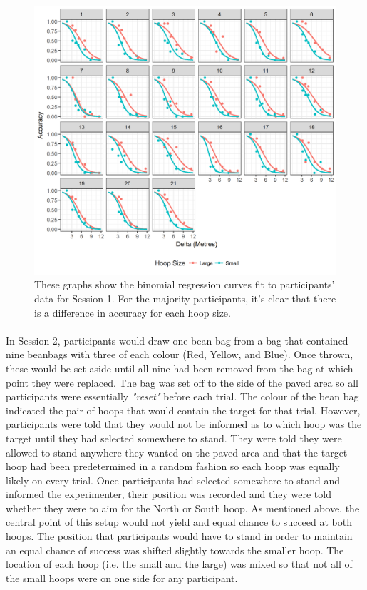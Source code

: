 \documentclass[12pt]{article}
\begin{document}
\begin{figure}[ht!]
	\includegraphics[scale= 0.9]{Figures/Experiment_3_Hoop_size/Session_1_plot}
	\centering
	\captionsetup{justification=centering}
	\caption{These graphs show the binomial regression curves fit to participants' data for Session 1. For the majority participants, it's clear that there is a difference in accuracy for each hoop size.}
	\label{fig:Session1-HoopSizes}
\end{figure}

\paragraph{} In Session 2, participants would draw one bean bag from a bag that contained nine beanbags with three of each colour (Red, Yellow, and Blue). Once thrown, these would be set aside until all nine had been removed from the bag at which point they were replaced. The bag was set off to the side of the paved area so all participants were essentially \textit{"reset"} before each trial. The colour of the bean bag indicated the pair of hoops that would contain the target for that trial. However, participants were told that they would not be informed as to which hoop was the target until they had selected somewhere to stand. They were told they were allowed to stand anywhere they wanted on the paved area and that the target hoop had been predetermined in a random fashion so each hoop was equally likely on every trial. Once participants had selected somewhere to stand and informed the experimenter, their position was recorded and they were told whether they were to aim for the North or South hoop. As mentioned above, the central point of this setup would not yield and equal chance to succeed at both hoops. The position that participants would have to stand in order to maintain an equal chance of success was shifted slightly towards the smaller hoop. The location of each hoop (i.e. the small and the large) was mixed so that not all of the small hoops were on one side for any participant. 
\end{document}
